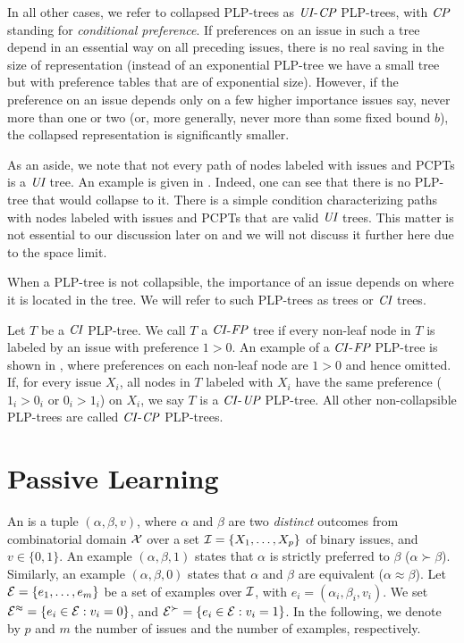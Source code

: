 In all other cases, we refer to collapsed PLP-trees as $\textit{UI}$-$\textit{CP}$ PLP-trees, 
with $\textit{CP}$ standing for \emph{conditional preference}. If preferences on 
an issue in such a tree depend in an essential way on all preceding 
issues, there is no real saving in the size of representation (instead 
of an exponential PLP-tree we have a small tree but with preference 
tables that are of exponential size). However, if the preference on an 
issue depends only on a few higher importance issues say, never more than 
one or two (or, more generally, never more than some fixed bound $b$), 
the collapsed representation is significantly smaller.

As an aside, we note that not every path of nodes labeled with issues
and PCPTs is a $\textit{UI}$ tree. An example is given in .
Indeed, one can see that there is no PLP-tree that would collapse to 
it. There is a simple condition 
characterizing paths with nodes labeled with issues and PCPTs that
are valid $\textit{UI}$ trees. This matter is not essential to our discussion later 
on and we will not discuss it further here due to the space limit.  
 
When a PLP-tree is not collapsible, the importance of an issue depends
on where it is located in the tree. We will refer to such PLP-trees as
 trees or $\textit{CI}$ trees.

Let $T$ be a $\textit{CI}$ PLP-tree.
We call $T$ a $\textit{CI}$-$\textit{FP}$ tree if every non-leaf node in $T$
is labeled by an issue with preference $1>0$.
An example of a $\textit{CI}$-$\textit{FP}$ PLP-tree is shown in , where
preferences on each non-leaf node are $1>0$ and hence omitted.
If, for every issue $X_i$, all nodes in $T$ labeled with $X_i$
have the same preference ($1_i>0_i$ or $0_i>1_i$) on $X_i$, we say $T$ is
a $\textit{CI}$-$\textit{UP}$ PLP-tree.  
All other non-collapsible PLP-trees are called $\textit{CI}$-$\textit{CP}$ PLP-trees.


\section{Passive Learning}

An  is a tuple $(\alpha, \beta, v)$, where $\alpha$ and 
$\beta$ are two \emph{distinct} outcomes from combinatorial domain 
$\mathcal{X}$ over a set $\mathcal{I}=\{X_1,\ldots,
X_p\}$ of binary issues, and $v \in \{0,1\}$. An example $(\alpha,\beta,1)$
states that $\alpha$ is strictly preferred to $\beta$ ($\alpha \succ \beta$).
Similarly, an example $(\alpha,\beta,0)$ states that $\alpha$ and $\beta$ 
are equivalent ($\alpha\approx\beta$). Let $\mathcal{E}=\{e_1,\ldots,e_m\}$ be a set 
of examples over $\mathcal{I}$, with $e_i=(\alpha_i,\beta_i,v_i)$. We set 
$\mathcal{E}^{\approx}= \{e_i \in \mathcal{E}: v_i=0\}$, and $\mathcal{E}^{\succ}= \{e_i \in \mathcal{E}: 
v_i =1\}$. 
In the following, we denote by $p$ and $m$ the number of issues and the number of
examples, respectively.

